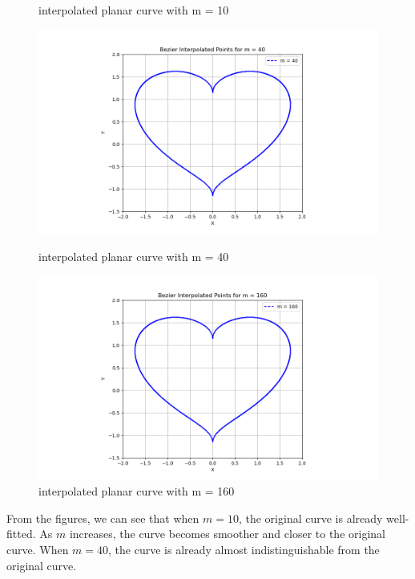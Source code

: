 \documentclass[a4paper]{article}
\begin{document}
\begin{figure}[ht]
\begin{minipage}[b]{0.45\textwidth}
    \caption{interpolated planar curve with m = 10}
    \label{fig:bezierm10}
  \end{minipage}
  \vfill
  \begin{minipage}[b]{0.45\textwidth}
    \centering
    \includegraphics[width=\textwidth]{figures/bezier_update2.png}
    \caption{interpolated planar curve with m = 40}
    \label{fig:bezierm40}
  \end{minipage}
  \hfill
  \begin{minipage}[b]{0.45\textwidth}
    \centering
    \includegraphics[width=\textwidth]{figures/bezier_update3.png}
    \caption{interpolated planar curve with m = 160}
    \label{fig:bezierm160}
  \end{minipage}
\end{figure}



From the figures, we can see that when \( m = 10 \), the original curve is already well-fitted. As \( m \) increases, the curve becomes smoother and closer to the original curve. When \( m = 40 \), the curve is already almost indistinguishable from the original curve. 
\end{document}
